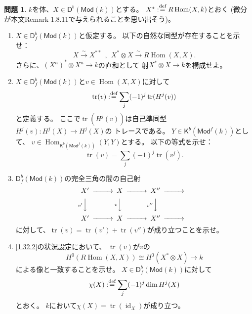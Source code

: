 \documentclass[uplatex,dvipdfmx]{jsarticle}
\theoremstyle{definition}
\newtheorem{prob}[prob]{問題}
\DeclareMathOperator{\Hom}{\mathrm{Hom}}
\DeclareMathOperator{\id}{\mathrm{id}}
\DeclareMathOperator{\tr}{\mathrm{tr}}
\newcommand{\Mod}{\mathsf{Mod}}
\newcommand{\sfK}{\mathsf{K}}
\newcommand{\sfD}{\mathsf{D}}
\def\dfn{:\overset{\mbox{{\scriptsize def}}}{=}}
\begin{document}
\begin{prob}\label{1.32}
  \(k\)を体、\(X\in \sfD^b(\Mod(k))\)とする。
  \(X^*\dfn R\Hom(X,k)\)とおく
  (微分が本文Remark 1.8.11で与えられることを思い出そう)。
  \begin{enumerate}
    \item \label{1.32.1}
    \(X\in \sfD^b_f(\Mod(k))\)と仮定する。
    以下の自然な同型が存在することを示せ：
    \[
    X\xrightarrow{\sim}X^{**} \ \ , \ \
    X^*\otimes X \xrightarrow{\sim} R\Hom(X,X).
    \]
    さらに、\((X^n)^*\otimes X^n \to k\)の直和として
    射\(X^*\otimes X\to k\)を構成せよ。
    \item \label{1.32.2}
    \(X\in \sfD^b_f(\Mod(k))\)と\(v\in \Hom(X,X)\)に対して
    \[
    \tr(v) \dfn \sum_j (-1)^j\tr(H^j(v))
    \]
    と定義する。
    ここで\(\tr(H^j(v))\)は自己準同型\(H^j(v):H^j(X)\to H^j(X)\)の
    トレースである。
    \(Y\in \sfK^b(\Mod^f(k))\)として、
    \(v\in \Hom_{\sfK^b(\Mod^f(k))}(Y,Y)\)とする。
    以下の等式を示せ：
    \[
    \tr(v) = \sum_j (-1)^j \tr(v^j).
    \]
    \item \label{1.32.3}
    \(\sfD^b_f(\Mod(k))\)の完全三角の間の自己射
    \[
    \begin{CD}
      X' @>>> X @>>> X'' @>>> \\
      @V{v'}VV @V{v}VV @V{v''}VV @. \\
      X' @>>> X @>>> X'' @>>> \\
    \end{CD}
    \]
    に対して、\(\tr(v) = \tr(v') + \tr(v'')\)が成り立つことを示せ。
    \item \label{1.32.4}
    \ref{1.32.2}の状況設定において、
    \(\tr(v)\)が\(v\)の
    \[
    H^0(R\Hom(X,X)) \cong H^0(X^*\otimes X) \to k
    \]
    による像と一致することを示せ。
    \(X\in \sfD^b_f(\Mod(k))\)に対して
    \[
    \chi(X) \dfn \sum_j (-1)^j\dim H^j(X)
    \]
    とおく。
    \(k\)において\(\chi(X) = \tr(\id_X)\)が成り立つ。
  \end{enumerate}
\end{prob}
\end{document}
